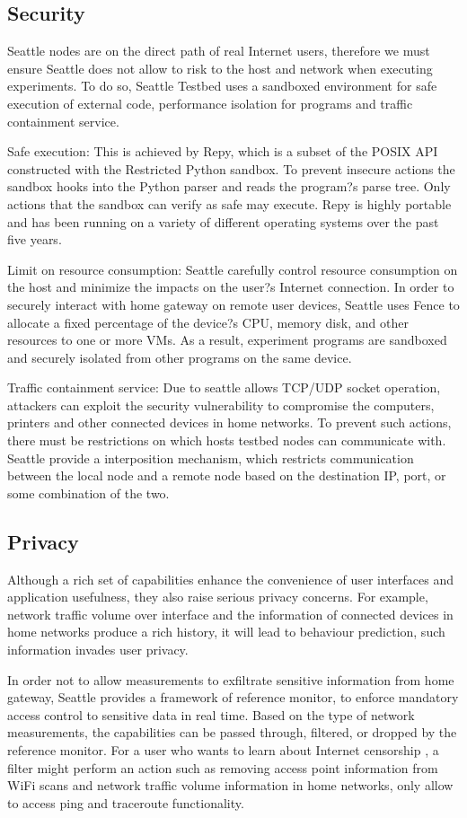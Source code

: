 \subsection{Security}
Seattle nodes are on the direct path of real Internet users, therefore we 
must ensure Seattle does not allow to risk to the host and network when 
executing experiments. To do so, Seattle Testbed uses a sandboxed 
environment for safe execution of external code, performance isolation for 
programs and traffic containment service. 

Safe execution: This is achieved by Repy, which is a subset of the POSIX API 
constructed with the Restricted Python sandbox. To prevent insecure actions 
the sandbox hooks into the Python parser and reads the program?s parse tree. 
Only actions that the sandbox can verify as safe may execute. Repy is highly 
portable and has been running on a variety of different operating systems 
over the past five years.

Limit on resource consumption: Seattle carefully control resource 
consumption on the host and minimize the impacts on the user?s Internet 
connection. In order to securely interact with home gateway on remote user 
devices, Seattle uses Fence to allocate a fixed percentage of the device?s 
CPU, memory disk, and other resources to one or more VMs. As a result, 
experiment programs are sandboxed and securely isolated from other programs 
on the same device. 

Traffic containment service: Due to seattle allows TCP/UDP socket operation, 
attackers can exploit the security vulnerability to compromise the 
computers, printers and other connected devices in home networks. To prevent 
such actions, there must be restrictions on which hosts testbed nodes can 
communicate with. Seattle provide a interposition mechanism, which restricts 
communication between the local node and a remote node based on the 
destination IP, port, or some combination of the two. 

\subsection{Privacy}
Although a rich set of capabilities enhance the convenience of user 
interfaces and application usefulness, they also raise serious privacy 
concerns. For example, network traffic volume over interface and the 
information of connected devices in home networks produce a rich history, it 
will lead to behaviour prediction, such information invades user privacy. 

In order not to allow measurements to exfiltrate sensitive information from 
home gateway, Seattle provides a framework of reference monitor, to enforce 
mandatory access control to sensitive data in real time. Based on the type 
of network measurements, the capabilities can be passed through, filtered, 
or dropped by the reference monitor. For a user who wants to learn about 
Internet censorship , a filter might perform an action such as removing 
access point information from WiFi scans and network traffic volume 
information in home networks, only allow to access ping and traceroute 
functionality.